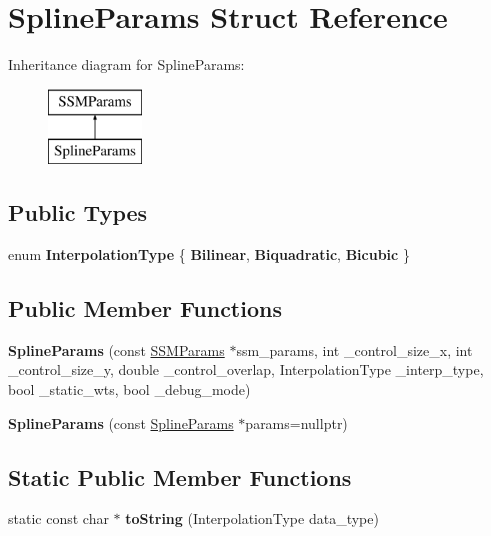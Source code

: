 \hypertarget{structSplineParams}{\section{Spline\-Params Struct Reference}
\label{structSplineParams}
}
Inheritance diagram for Spline\-Params\-:\begin{figure}[H]
\begin{center}
\leavevmode
\includegraphics[height=2.000000cm]{structSplineParams}
\end{center}
\end{figure}
\subsection*{Public Types}
\begin{DoxyCompactItemize}
\item 
enum {\bfseries Interpolation\-Type} \{ {\bfseries Bilinear}, 
{\bfseries Biquadratic}, 
{\bfseries Bicubic}
 \}
\end{DoxyCompactItemize}
\subsection*{Public Member Functions}
\begin{DoxyCompactItemize}
\item 
\hypertarget{structSplineParams_a19cc9f6736429ecdd84bbb81876e9263}{{\bfseries Spline\-Params} (const \hyperlink{structSSMParams}{S\-S\-M\-Params} $\ast$ssm\-\_\-params, int \-\_\-control\-\_\-size\-\_\-x, int \-\_\-control\-\_\-size\-\_\-y, double \-\_\-control\-\_\-overlap, Interpolation\-Type \-\_\-interp\-\_\-type, bool \-\_\-static\-\_\-wts, bool \-\_\-debug\-\_\-mode)}\label{structSplineParams_a19cc9f6736429ecdd84bbb81876e9263}

\item 
\hypertarget{structSplineParams_aac8f520c7598e0ac82d0a014ce417523}{{\bfseries Spline\-Params} (const \hyperlink{structSplineParams}{Spline\-Params} $\ast$params=nullptr)}\label{structSplineParams_aac8f520c7598e0ac82d0a014ce417523}

\end{DoxyCompactItemize}
\subsection*{Static Public Member Functions}
\begin{DoxyCompactItemize}
\item 
\hypertarget{structSplineParams_ab0e9dc413b93a212715f2f3d8050d997}{static const char $\ast$ {\bfseries to\-String} (Interpolation\-Type data\-\_\-type)}\label{structSplineParams_ab0e9dc413b93a212715f2f3d8050d997}

\end{DoxyCompactItemize}
